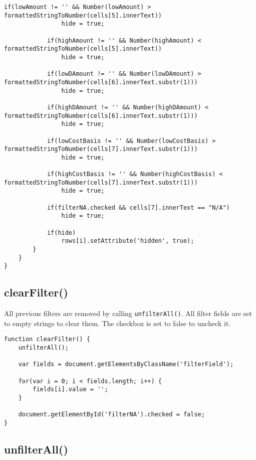 \documentclass[letterpaper]{article}
\begin{document}
\begin{lstlisting}[firstnumber=512]
            if(lowAmount != '' && Number(lowAmount) > formattedStringToNumber(cells[5].innerText))
                hide = true;

            if(highAmount != '' && Number(highAmount) < formattedStringToNumber(cells[5].innerText))
                hide = true;

            if(lowDAmount != '' && Number(lowDAmount) > formattedStringToNumber(cells[6].innerText.substr(1)))
                hide = true;

            if(highDAmount != '' && Number(highDAmount) < formattedStringToNumber(cells[6].innerText.substr(1)))
                hide = true;

            if(lowCostBasis != '' && Number(lowCostBasis) > formattedStringToNumber(cells[7].innerText.substr(1)))
                hide = true;

            if(highCostBasis != '' && Number(highCostBasis) < formattedStringToNumber(cells[7].innerText.substr(1)))
                hide = true;

            if(filterNA.checked && cells[7].innerText == "N/A")
                hide = true;

            if(hide)
                rows[i].setAttribute('hidden', true);
        }
    }
}
\end{lstlisting}

\subsection{clearFilter()}

All previous filters are removed by calling \lstinline{unfilterAll()}.
All filter fields are set to empty strings to clear them.
The checkbox is set to false to uncheck it.

\begin{lstlisting}[firstnumber=585]
function clearFilter() {
    unfilterAll();

    var fields = document.getElementsByClassName('filterField');

    for(var i = 0; i < fields.length; i++) {
        fields[i].value = '';
    }

    document.getElementById('filterNA').checked = false;
}
\end{lstlisting}

\subsection{unfilterAll()}
\end{document}
